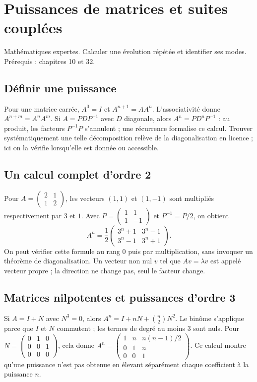 \documentclass[../cours_tle.tex]{subfiles}
\begin{document}
\setcounter{chapter}{32}
\chapter{Puissances de matrices et suites couplées}
\label{ch:33}
\begin{objectif}
Mathématiques expertes. Calculer une évolution répétée et identifier ses modes. Prérequis : chapitres 10 et 32.
\end{objectif}
\section{Définir une puissance}
Pour une matrice carrée, $A^0=I$ et $A^{n+1}=AA^n$. L'associativité donne $A^{n+m}=A^nA^m$.
Si $A=PDP^{-1}$ avec $D$ diagonale, alors $A^n=PD^nP^{-1}$ : au produit, les facteurs $P^{-1}P$ s'annulent ; une récurrence formalise ce calcul.
Trouver systématiquement une telle décomposition relève de la diagonalisation en licence ; ici on la vérifie lorsqu'elle est donnée ou accessible.
\section{Un calcul complet d'ordre 2}
Pour $A=\begin{pmatrix}2&1\\1&2\end{pmatrix}$, les vecteurs $(1,1)$ et $(1,-1)$ sont multipliés respectivement par $3$ et $1$.
Avec $P=\begin{pmatrix}1&1\\1&-1\end{pmatrix}$ et $P^{-1}=P/2$, on obtient
\[
A^n=\frac12\begin{pmatrix}3^n+1&3^n-1\\3^n-1&3^n+1\end{pmatrix}.
\]
On peut vérifier cette formule au rang $0$ puis par multiplication, sans invoquer un théorème de diagonalisation.
Un vecteur non nul $v$ tel que $Av=\lambda v$ est appelé vecteur propre ; la direction ne change pas, seul le facteur change.
\section{Matrices nilpotentes et puissances d'ordre 3}
Si $A=I+N$ avec $N^3=0$, alors
$A^n=I+nN+\binom n2N^2$.
Le binôme s'applique parce que $I$ et $N$ commutent ; les termes de degré au moins $3$ sont nuls.
Pour $N=\begin{pmatrix}0&1&0\\0&0&1\\0&0&0\end{pmatrix}$, cela donne
$A^n=\begin{pmatrix}1&n&n(n-1)/2\\0&1&n\\0&0&1\end{pmatrix}$.
Ce calcul montre qu'une puissance n'est pas obtenue en élevant séparément chaque coefficient à la puissance $n$.
\end{document}
